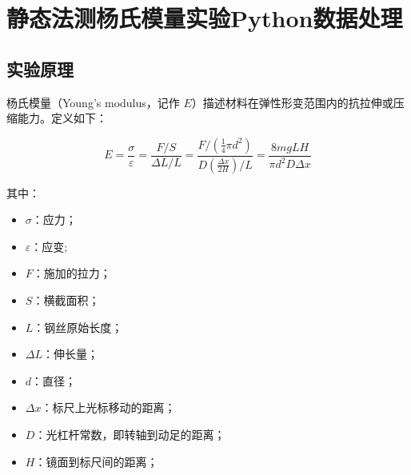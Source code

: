 \chapter{静态法测杨氏模量实验Python数据处理}

\section{实验原理}

杨氏模量（Young's modulus，记作 $E$）描述材料在弹性形变范围内的抗拉伸或压缩能力。定义如下：

\[
E = \frac{\sigma}{\varepsilon} = \frac{F / S}{\Delta L / L} = \frac{F / \left( \frac{1}{4} \pi d^2 \right)}{ D \left( \frac{\Delta x }{2H}  \right) / L} = \frac{8 m g LH}{\pi d^2 D \Delta x}
\]

其中：

\begin{itemize}
  \item $\sigma$：应力；
  \item $\varepsilon$：应变;
  \item $F$：施加的拉力；
  \item $S$：横截面积；
  \item $L$：钢丝原始长度；
  \item $\Delta L$：伸长量；
  \item $d$：直径；
  \item $\Delta x$：标尺上光标移动的距离；
  \item $D$：光杠杆常数，即转轴到动足的距离；
  \item $H$：镜面到标尺间的距离；
\end{itemize}

